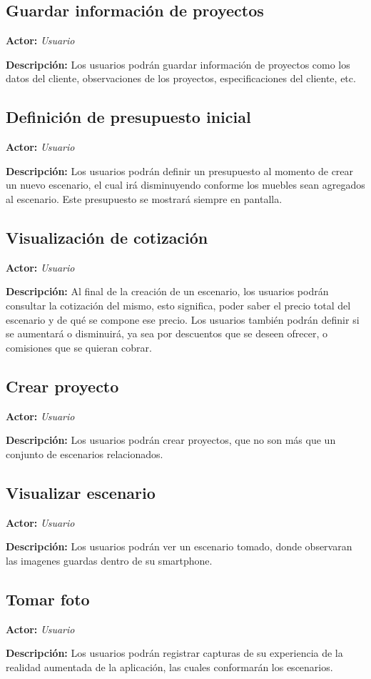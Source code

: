 \subsection{Guardar información de proyectos}
\textbf{Actor:} \textit{Usuario} \par
\textbf{Descripción:} Los usuarios podrán guardar información de proyectos como los datos del cliente, observaciones de los proyectos, especificaciones del cliente, etc.

\subsection{Definición de presupuesto inicial}
\textbf{Actor:} \textit{Usuario} \par
\textbf{Descripción:} Los usuarios podrán definir un presupuesto al momento de crear un nuevo escenario, el cual irá disminuyendo conforme los muebles sean agregados al escenario. Este presupuesto se mostrará siempre en pantalla.

\subsection{Visualización de cotización}
\textbf{Actor:} \textit{Usuario} \par
\textbf{Descripción:} Al final de la creación de un escenario, los usuarios podrán consultar la cotización del mismo, esto significa, poder saber el precio total del escenario y de qué se compone ese precio. Los usuarios también podrán definir si se aumentará o disminuirá, ya sea por descuentos que se deseen ofrecer, o comisiones que se quieran cobrar.

\subsection{Crear proyecto}
\textbf{Actor:} \textit{Usuario} \par
\textbf{Descripción:} Los usuarios podrán crear proyectos, que no son más que un conjunto de escenarios relacionados.

\subsection{Visualizar escenario}
\textbf{Actor:} \textit{Usuario} \par
\textbf{Descripción:} Los usuarios podrán ver un escenario tomado, donde observaran las imagenes guardas dentro de su smartphone.

\subsection{Tomar foto}
\textbf{Actor:} \textit{Usuario} \par
\textbf{Descripción:} Los usuarios podrán registrar capturas de su experiencia de la realidad aumentada de la aplicación, las cuales conformarán los escenarios.

